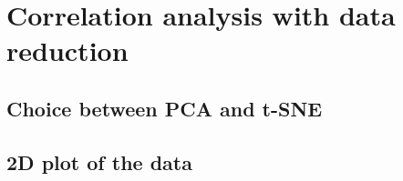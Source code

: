 \section{Correlation analysis with data reduction}

\subsection{Choice between PCA and t-SNE}

\subsection{2D plot of the data}
